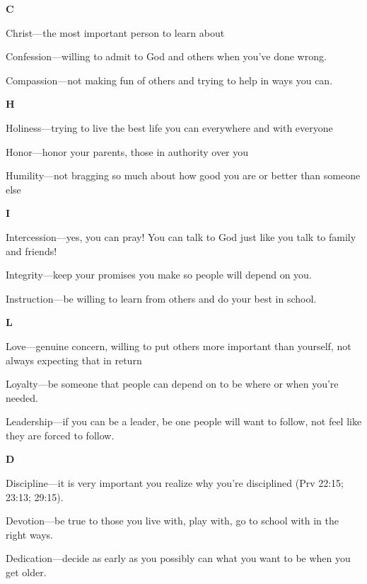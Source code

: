 \begin{compactenum}[I.]
    \item \textbf{C} 
    \begin{compactenum}[A.]
    	\item Christ—the most important person to learn about
    	\item Confession—willing to admit to God and others when you’ve done wrong.
    	\item Compassion—not making fun of others and trying to help in ways you can.
    \end{compactenum}
    \item \textbf{H} 
    \begin{compactenum}[A.]
    	\item Holiness—trying to live the best life you can everywhere and with everyone
    	\item Honor—honor your parents, those in authority over you
    	\item Humility—not bragging so much about how good you are or better than someone else
    \end{compactenum}
    \item \textbf{I} 
    \begin{compactenum}[A.]
    	\item Intercession—yes, you can pray!  You can talk to God just like you talk to family and friends!
    	\item Integrity—keep your promises you make so people will depend on you.
    	\item  Instruction—be willing to learn from others and do your best in school.
    \end{compactenum}
    \item \textbf{L} 
    \begin{compactenum}[A.]
    	\item Love—genuine concern, willing to put others more important than yourself, not always expecting that in return
    	\item Loyalty—be someone that people can depend on to be where or when you’re needed.
    	\item Leadership—if you can be a leader, be one people will want to follow, not feel like they are forced to follow.
    \end{compactenum}
    \item \textbf{D} 
    \begin{compactenum}[A.]
    	\item Discipline—it is very important you realize why you’re disciplined (Prv 22:15; 23:13; 29:15).
    	\item Devotion—be true to those you live with, play with, go to school with in the right ways.
    	\item  Dedication—decide as early as you possibly can what you want to be when you get older.\\
    \end{compactenum}
\end{compactenum}
